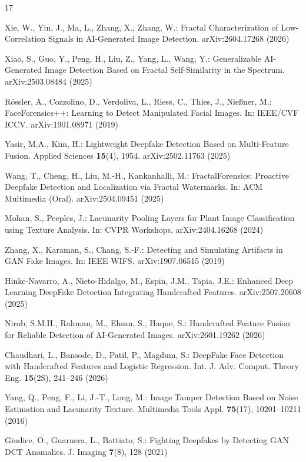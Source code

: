 \documentclass[runningheads]{llncs}
\begin{document}
\begin{thebibliography}{17}

Xie, W., Yin, J., Ma, L., Zhang, X., Zhang, W.:
Fractal Characterization of Low-Correlation Signals in AI-Generated Image Detection.
arXiv:2604.17268 (2026)

Xiao, S., Guo, Y., Peng, H., Liu, Z., Yang, L., Wang, Y.:
Generalizable AI-Generated Image Detection Based on Fractal Self-Similarity in the Spectrum.
arXiv:2503.08484 (2025)

R\"{o}ssler, A., Cozzolino, D., Verdoliva, L., Riess, C., Thies, J., Nie{\ss}ner, M.:
FaceForensics++: Learning to Detect Manipulated Facial Images.
In: IEEE/CVF ICCV. arXiv:1901.08971 (2019)

Yasir, M.A., Kim, H.:
Lightweight Deepfake Detection Based on Multi-Feature Fusion.
Applied Sciences \textbf{15}(4), 1954. arXiv:2502.11763 (2025)

Wang, T., Cheng, H., Liu, M.-H., Kankanhalli, M.:
FractalForensics: Proactive Deepfake Detection and Localization via Fractal Watermarks.
In: ACM Multimedia (Oral). arXiv:2504.09451 (2025)

Mohan, S., Peeples, J.:
Lacunarity Pooling Layers for Plant Image Classification using Texture Analysis.
In: CVPR Workshops. arXiv:2404.16268 (2024)

Zhang, X., Karaman, S., Chang, S.-F.:
Detecting and Simulating Artifacts in GAN Fake Images.
In: IEEE WIFS. arXiv:1907.06515 (2019)

Hinke-Navarro, A., Nieto-Hidalgo, M., Espin, J.M., Tapia, J.E.:
Enhanced Deep Learning DeepFake Detection Integrating Handcrafted Features.
arXiv:2507.20608 (2025)

Nirob, S.M.H., Rahman, M., Ehsan, S., Haque, S.:
Handcrafted Feature Fusion for Reliable Detection of AI-Generated Images.
arXiv:2601.19262 (2026)

Chaudhari, L., Bansode, D., Patil, P., Magdum, S.:
DeepFake Face Detection with Handcrafted Features and Logistic Regression.
Int. J. Adv. Comput. Theory Eng. \textbf{15}(2S), 241--246 (2026)

Yang, Q., Peng, F., Li, J.-T., Long, M.:
Image Tamper Detection Based on Noise Estimation and Lacunarity Texture.
Multimedia Tools Appl. \textbf{75}(17), 10201--10211 (2016)

Giudice, O., Guarnera, L., Battiato, S.:
Fighting Deepfakes by Detecting GAN DCT Anomalies.
J. Imaging \textbf{7}(8), 128 (2021)


\end{thebibliography}
\end{document}
